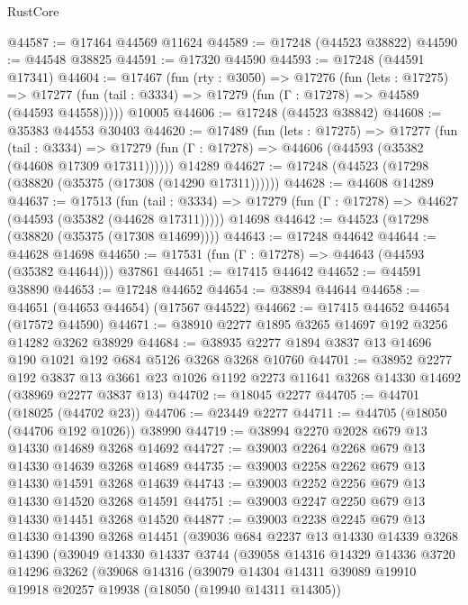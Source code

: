 \begin{lexlean}{RustCore}
\begin{coremodule}
@44587 := @17464 @44569 @11624
@44589 := @17248 (@44523 @38822)
@44590 := @44548 @38825
@44591 := @17320 @44590
@44593 := @17248 (@44591 @17341)
@44604 := @17467
    (fun (rty : @3050) =>
    @17276
      (fun (lets : @17275) =>
      @17277 (fun (tail : @3334) => @17279 (fun (Γ : @17278) => @44589 (@44593 @44558)))))
    @10005
@44606 := @17248 (@44523 @38842)
@44608 := @35383 @44553 @30403
@44620 := @17489
    (fun (lets : @17275) =>
    @17277
      (fun (tail : @3334) =>
      @17279 (fun (Γ : @17278) => @44606 (@44593 (@35382 (@44608 @17309 @17311))))))
    @14289
@44627 := @17248 (@44523 (@17298 (@38820 (@35375 (@17308 (@14290 @17311))))))
@44628 := @44608 @14289
@44637 := @17513
    (fun (tail : @3334) => @17279 (fun (Γ : @17278) => @44627 (@44593 (@35382 (@44628 @17311)))))
    @14698
@44642 := @44523 (@17298 (@38820 (@35375 (@17308 @14699))))
@44643 := @17248 @44642
@44644 := @44628 @14698
@44650 := @17531 (fun (Γ : @17278) => @44643 (@44593 (@35382 @44644))) @37861
@44651 := @17415 @44642
@44652 := @44591 @38890
@44653 := @17248 @44652
@44654 := @38894 @44644
@44658 := @44651 (@44653 @44654) (@17567 @44522)
@44662 := @17415 @44652 @44654 (@17572 @44590)
@44671 := @38910 @2277 @1895 @3265 @14697 @192 @3256 @14282 @3262 @38929
@44684 := @38935 @2277 @1894 @3837 @13 @14696 @190 @1021 @192 @684 @5126 @3268 @3268 @10760
@44701 := @38952
    @2277
    @192
    @3837
    @13
    @3661
    @23
    @1026
    @1192
    @2273
    @11641
    @3268
    @14330
    @14692
    (@38969 @2277 @3837 @13)
@44702 := @18045 @2277
@44705 := @44701 (@18025 (@44702 @23))
@44706 := @23449 @2277
@44711 := @44705 (@18050 (@44706 @192 @1026)) @38990
@44719 := @38994 @2270 @2028 @679 @13 @14330 @14689 @3268 @14692
@44727 := @39003 @2264 @2268 @679 @13 @14330 @14639 @3268 @14689
@44735 := @39003 @2258 @2262 @679 @13 @14330 @14591 @3268 @14639
@44743 := @39003 @2252 @2256 @679 @13 @14330 @14520 @3268 @14591
@44751 := @39003 @2247 @2250 @679 @13 @14330 @14451 @3268 @14520
@44877 := @39003
    @2238
    @2245
    @679
    @13
    @14330
    @14390
    @3268
    @14451
    (@39036
      @684
      @2237
      @13
      @14330
      @14339
      @3268
      @14390
      (@39049
        @14330
        @14337
        @3744
        (@39058
          @14316
          @14329
          @14336
          @3720
          @14296
          @3262
          (@39068
            @14316
            (@39079
              @14304
              @14311
              @39089
              @19910
              @19918
              @20257
              @19938
              (@18050 (@19940 @14311 @14305))

\end{coremodule}
\end{lexlean}
